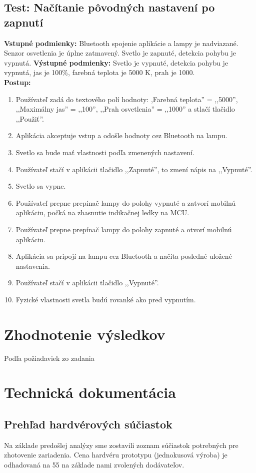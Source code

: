 \documentclass[12pt, a4paper]{article}
\begin{document}
\subsection{Test: Načítanie pôvodných nastavení po zapnutí}
\noindent\textbf{Vstupné podmienky:} Bluetooth spojenie aplikácie a lampy je nadviazané. Senzor osvetlenia je úplne zatmavený. Svetlo je zapnuté, detekcia pohybu je vypnutá.
\textbf{Výstupné podmienky:} Svetlo je vypnuté, detekcia pohybu je vypnutá, jas je 100\%, farebná teplota je 5000 K, prah je 1000. \\
\textbf{Postup:}
\begin{enumerate}
\itemsep0pt
\item Používateľ zadá do textového polí hodnoty: ,Farebná teplota'' = ,,5000'', ,,Maximálny jas'' = ,,100'',  ,,Prah osvetlenia'' = ,,1000'' a stlačí tlačidlo ,,Použiť''.
\item Aplikácia akceptuje vstup a odošle hodnoty cez Bluetooth na lampu.
\item Svetlo sa bude mať vlastnosti podľa zmenených nastavení.
\item Používateľ stačí v aplikácii tlačidlo ,,Zapnuté'', to zmení nápis na ,,Vypnuté''.
\item Svetlo sa vypne.
\item Používateľ prepne prepínač lampy do polohy vypnuté a zatvorí mobilnú aplikáciu, počká na zhasnutie indikačnej ledky na MCU.
\item Používateľ prepne prepínač lampy do polohy zapnuté a otvorí mobilnú aplikáciu.
\item Aplikácia sa pripojí na lampu cez Bluetooth a načíta posledné uložené nastavenia. 
\item Používateľ stačí v aplikácii tlačidlo ,,Vypnuté''.
\item Fyzické vlastnosti svetla budú rovanké ako pred vypnutím.
\end{enumerate}

\section{Zhodnotenie výsledkov}
Podľa požiadaviek zo zadania 


\printbibliography[title={Zoznam použitej literatúry}]
\newpage

\section{Technická dokumentácia}
\subsection{Prehľad hardvérových súčiastok}
Na základe predošlej analýzy sme zostavili zoznam súčiastok potrebných pre zhotovenie zariadenia. Cena hardvéru prototypu (jednokusová výroba) je odhadovaná na 55 \texteuro na základe nami zvolených dodávateľov.
\end{document}
